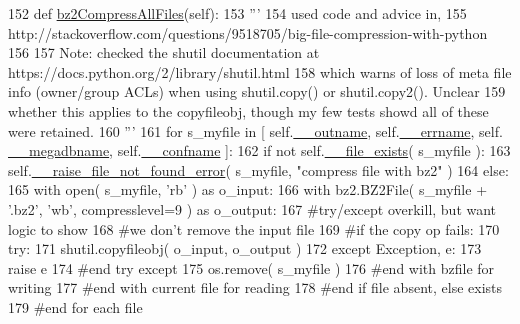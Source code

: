 \begin{DoxyCode}
152     \textcolor{keyword}{def }\hyperlink{classnegui_1_1pgoutputsimupop_1_1PGOutputSimuPop_a19aedb58718296302655581be640f995}{bz2CompressAllFiles}(self):
153         \textcolor{stringliteral}{'''}
154 \textcolor{stringliteral}{        used code and advice in, }
155 \textcolor{stringliteral}{        http://stackoverflow.com/questions/9518705/big-file-compression-with-python}
156 \textcolor{stringliteral}{}
157 \textcolor{stringliteral}{        Note: checked the shutil documentation at https://docs.python.org/2/library/shutil.html}
158 \textcolor{stringliteral}{        which warns of loss of meta file info (owner/group ACLs) when using shutil.copy() or
       shutil.copy2().  Unclear}
159 \textcolor{stringliteral}{        whether this applies to the copyfileobj, though my few tests showd all of these were retained.}
160 \textcolor{stringliteral}{        '''}
161         \textcolor{keywordflow}{for} s\_myfile \textcolor{keywordflow}{in} [ self.\hyperlink{classnegui_1_1pgoutputsimupop_1_1PGOutputSimuPop_a50f64be6bb990a0ac6898a44b4bf6fbc}{\_\_outname}, self.\hyperlink{classnegui_1_1pgoutputsimupop_1_1PGOutputSimuPop_a26363a7bbc4ae53b86585e32f0360e2a}{\_\_errname}, self.
      \hyperlink{classnegui_1_1pgoutputsimupop_1_1PGOutputSimuPop_aa89de70104807ce7e26bb17310f74b97}{\_\_megadbname}, self.\hyperlink{classnegui_1_1pgoutputsimupop_1_1PGOutputSimuPop_af5c9a72247505d2c2bb3d7400cbc09b3}{\_\_confname} ]:
162             \textcolor{keywordflow}{if} \textcolor{keywordflow}{not} self.\hyperlink{classnegui_1_1pgoutputsimupop_1_1PGOutputSimuPop_a1fdfb988619bd4a9d377a1e20f52839c}{\_\_file\_exists}( s\_myfile ):
163                 self.\hyperlink{classnegui_1_1pgoutputsimupop_1_1PGOutputSimuPop_abf6aab4f7982c2b0f9e4544343bf241b}{\_\_raise\_file\_not\_found\_error}( s\_myfile, \textcolor{stringliteral}{"compress file
       with bz2"}  )
164             \textcolor{keywordflow}{else}:
165                 with open( s\_myfile, \textcolor{stringliteral}{'rb'} ) \textcolor{keyword}{as} o\_input:
166                     with bz2.BZ2File( s\_myfile + \textcolor{stringliteral}{'.bz2'}, \textcolor{stringliteral}{'wb'}, compresslevel=9 ) \textcolor{keyword}{as} o\_output:
167                         \textcolor{comment}{#try/except overkill, but want logic to show}
168                         \textcolor{comment}{#we don't remove the input file}
169                         \textcolor{comment}{#if the copy op fails:}
170                         \textcolor{keywordflow}{try}: 
171                             shutil.copyfileobj( o\_input, o\_output )
172                         \textcolor{keywordflow}{except} Exception,  e:
173                             \textcolor{keywordflow}{raise} e
174                         \textcolor{comment}{#end try except}
175                         os.remove( s\_myfile )   
176                     \textcolor{comment}{#end with bzfile for writing}
177                 \textcolor{comment}{#end with current file for reading}
178             \textcolor{comment}{#end if file absent, else exists}
179         \textcolor{comment}{#end for each file}
\end{DoxyCode}
